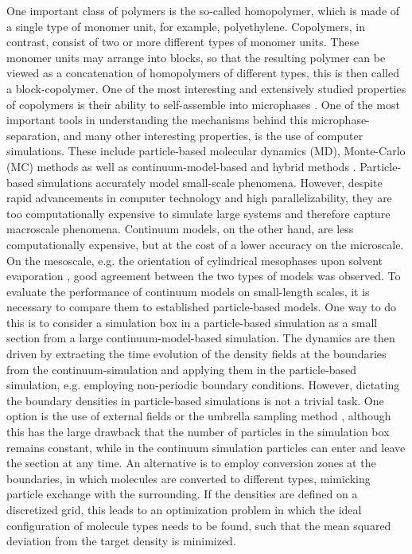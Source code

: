 \documentclass[bachelor,       %
               twoside,        %
               BCOR10mm,       %
                ngerman,english  %
               ]{GAUBM}
\begin{document}
One important class of polymers is the so-called homopolymer, which is made of a single type of monomer unit, for example, polyethylene. Copolymers, in contrast, consist of two or more different types of monomer units. These monomer units may arrange into blocks, so that the resulting polymer can be viewed as a concatenation of homopolymers of different types, this is then called a block-copolymer. One of the most interesting and extensively studied properties of copolymers is their ability to self-assemble into microphases \cite{leibler1980theory}. One of the most important tools in understanding the mechanisms behind this microphase-separation, and many other interesting properties, is the use of computer simulations. These include particle-based molecular dynamics (MD), Monte-Carlo (MC) methods as well as continuum-model-based and hybrid methods \cite{Shuanhu2017}. Particle-based simulations accurately model small-scale phenomena. However, despite rapid advancements in computer technology and high parallelizability, they are too computationally expensive to simulate large systems and therefore capture macroscale phenomena. Continuum models, on the other hand, are less computationally expensive, but at the cost of a lower accuracy on the microscale. On the mesoscale, e.g. the orientation of cylindrical mesophases upon solvent evaporation \cite{Dreyer22}, good agreement between the two types of models was observed. To evaluate the performance of continuum models on small-length scales, it is necessary to compare them to established particle-based models. One way to do this is to consider a simulation box in a particle-based simulation as a small section from a large continuum-model-based simulation. The dynamics are then driven by extracting the time evolution of the density fields at the boundaries from the continuum-simulation and applying them in the particle-based simulation, e.g. employing non-periodic boundary conditions. However, dictating the boundary densities in particle-based simulations is not a trivial task. One option is the use of external fields or the umbrella sampling method \cite{glenn74}, although this has the large drawback that the number of particles in the simulation box remains constant, while in the continuum simulation particles can enter and leave the section at any time. An alternative is to employ conversion zones at the boundaries, in which molecules are converted to different types, mimicking particle exchange with the surrounding. If the densities are defined on a discretized grid, this leads to an optimization problem in which the ideal configuration of molecule types needs to be found, such that the mean squared deviation from the target density is minimized. \\
\end{document}
